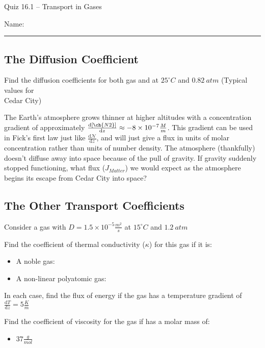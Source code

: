 \documentclass[11pt, letterpaper]{memoir}
\begin{document}
	\begin{center}
		{\large Quiz 16.1 -- Transport in Gases}
	\end{center}
	{\large Name: \rule[-1mm]{4in}{.1pt} 


\subsection*{The Diffusion Coefficient}
Find the diffusion coefficients for both  gas and  at $25^\circ C$ and $0.82~atm$ (Typical values for\\Cedar City)

\vspace{18em}\noindent
The Earth's atmosphere grows thinner at higher altitudes with a concentration gradient of approximately $\frac{\mathrm{d}\left[\ch{N2}\right]}{\mathrm{d}z}\approx-8\times10^{-7}\frac{M}{m}$. This gradient can be used in Fick's first law just like $\frac{\mathrm{d}\mathcal{N}}{\mathrm{d}z}$, and will just give a flux in units of molar concentration rather than units of number density. The atmosphere (thankfully) doesn't diffuse away into space because of the pull of gravity. If gravity suddenly stopped functioning, what flux ($J_{Matter}$) we would expect as the atmosphere begins its escape from Cedar City into space?

\vspace{20em}
\subsection*{The Other Transport Coefficients}
Consider a gas with $D=1.5\times10^{-5}\frac{m^2}{s}$ at $15^\circ C$ and $1.2~atm$

\noindent Find the coefficient of thermal conductivity ($\kappa$) for this gas if it is:
\begin{itemize}
	\item A noble gas:
	
	\vspace{6em}
	\item A non-linear polyatomic gas:
\end{itemize}

\vspace{6em}\noindent
In each case, find the flux of energy if the gas has a temperature gradient of $\frac{\mathrm{d}T}{\mathrm{d}z}=5\frac{K}{m}$

\vspace{11em}\noindent
Find the coefficient of viscosity for the gas if has a molar mass of:
\begin{itemize}
	\item $37\frac{g}{mol}$
	

\end{itemize}}
\end{document}
